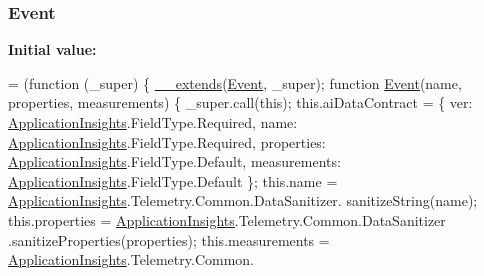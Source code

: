 \subsubsection[{\texorpdfstring{Event}{Event}}]{ Event}\hypertarget{_scripts_2ai_80_822_89-build00167_8js_aed01caf943a868f8e12e0420da8fa542}{}\label{_scripts_2ai_80_822_89-build00167_8js_aed01caf943a868f8e12e0420da8fa542}
{\bfseries Initial value\+:}
\begin{DoxyCode}
= (\textcolor{keyword}{function} (\_super) \{
                \hyperlink{obj_2_release_2_package_2_package_tmp_2_scripts_2ai_80_822_89-build00167_8js_ac09f4951ac4b25df0272d4e78ff85ae0}{\_\_extends}(\hyperlink{obj_2_release_2_package_2_package_tmp_2_scripts_2ai_80_822_89-build00167_8js_aed01caf943a868f8e12e0420da8fa542}{Event}, \_super);
                \textcolor{keyword}{function} \hyperlink{obj_2_release_2_package_2_package_tmp_2_scripts_2ai_80_822_89-build00167_8js_aed01caf943a868f8e12e0420da8fa542}{Event}(name, properties, measurements) \{
                    \_super.call(\textcolor{keyword}{this});
                    this.aiDataContract = \{
                        ver: \hyperlink{obj_2_release_2_package_2_package_tmp_2_scripts_2ai_80_822_89-build00167_8js_aa415ef4f8cdd699689ef4b61db7656d8}{ApplicationInsights}.FieldType.Required,
                        name: \hyperlink{obj_2_release_2_package_2_package_tmp_2_scripts_2ai_80_822_89-build00167_8js_aa415ef4f8cdd699689ef4b61db7656d8}{ApplicationInsights}.FieldType.Required,
                        properties: \hyperlink{obj_2_release_2_package_2_package_tmp_2_scripts_2ai_80_822_89-build00167_8js_aa415ef4f8cdd699689ef4b61db7656d8}{ApplicationInsights}.FieldType.Default,
                        measurements: \hyperlink{obj_2_release_2_package_2_package_tmp_2_scripts_2ai_80_822_89-build00167_8js_aa415ef4f8cdd699689ef4b61db7656d8}{ApplicationInsights}.FieldType.Default
                    \};
                    this.name = \hyperlink{obj_2_release_2_package_2_package_tmp_2_scripts_2ai_80_822_89-build00167_8js_aa415ef4f8cdd699689ef4b61db7656d8}{ApplicationInsights}.Telemetry.Common.DataSanitizer.
      sanitizeString(name);
                    this.properties = \hyperlink{obj_2_release_2_package_2_package_tmp_2_scripts_2ai_80_822_89-build00167_8js_aa415ef4f8cdd699689ef4b61db7656d8}{ApplicationInsights}.Telemetry.Common.DataSanitizer
      .sanitizeProperties(properties);
                    this.measurements = \hyperlink{obj_2_release_2_package_2_package_tmp_2_scripts_2ai_80_822_89-build00167_8js_aa415ef4f8cdd699689ef4b61db7656d8}{ApplicationInsights}.Telemetry.Common.

\end{DoxyCode}
